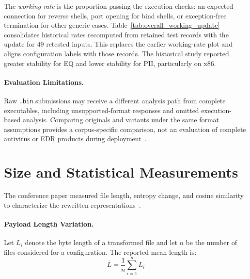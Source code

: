 \documentclass[runningheads]{llncs}
\begin{document}
\label{par:working_rate}
The \emph{working rate} is the proportion passing the execution checks:
an expected connection for reverse shells, port opening for bind shells,
or exception-free termination for other generic cases.
Table~\ref{tab:overall_working_update} consolidates historical rates
recomputed from retained test records with the update for 49 retested
inputs. This replaces the earlier working-rate plot and aligns
configuration labels with those records. The historical study reported
greater stability for EQ and lower stability for PII, particularly on x86.



\paragraph{Evaluation Limitations.}
Raw \texttt{.bin} submissions may receive a different analysis path from
complete executables, including unsupported-format responses and omitted
execution-based analysis. Comparing originals and variants under the
same format assumptions provides a corpus-specific comparison, not an
evaluation of complete antivirus or EDR products during deployment~\cite{zone_secrypt_2026}.

\section{Size and Statistical Measurements}\label{sect:var_metrics}
The conference paper measured file length, entropy change, and cosine
similarity to characterize the rewritten representations~\cite{zone_secrypt_2026}.

\paragraph{Payload Length Variation.}
Let $L_i$ denote the byte length of a transformed file and let $n$ be the number of files considered for a configuration. The reported mean length is:
\[
\overline{L} = \frac{1}{n} \sum_{i=1}^{n} L_i
\]
\end{document}
